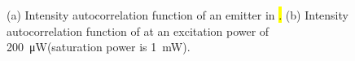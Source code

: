 		\begin{figure}[htp]
			\begin{subfigure}[tp]{ 0.49\linewidth}
				\centering
				\caption{}\label{subfig::g2_a}
			\end{subfigure}
			\hfill
			\begin{subfigure}[tp]{ 0.49\linewidth}
				\centering
				\caption{}\label{subfig::g2_b}
			\end{subfigure}
			\caption[Intensity autocorrelation measurements for \hl and \vl]{(a) Intensity autocorrelation function of an emitter in \hl. (b) Intensity autocorrelation function of \embroad at an excitation power of \SIlist{200}{\micro\W}(saturation power is \SI{1}{mW}).}
			\label{fig::g2}
		\end{figure}

